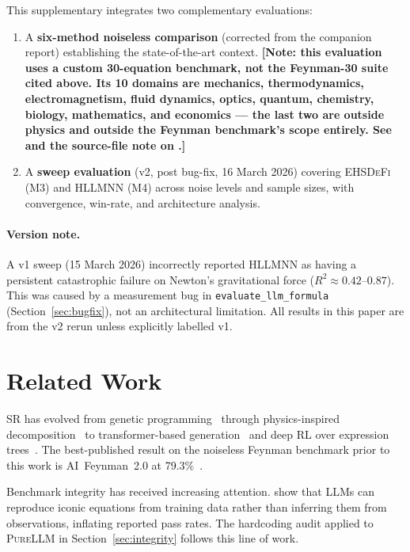 \documentclass[twoside,11pt]{article}
\newcommand{\PureLLM}{\textsc{PureLLM}}
\newcommand{\EHD}{\textsc{EHSDeFi}}
\newcommand{\HSL}{\textsc{HLLMNN}}
\newcommand{\Rsq}{R^{2}}
\begin{document}
This supplementary integrates two complementary evaluations:
\begin{enumerate}
  \item A \textbf{six-method noiseless comparison} (corrected from the
    companion report) establishing the state-of-the-art context. \textbf{[Note:
    this evaluation uses a custom 30-equation benchmark, not the Feynman-30
    suite cited above. Its 10 domains are mechanics, thermodynamics,
    electromagnetism, fluid dynamics, optics, quantum, chemistry, biology,
    mathematics, and economics --- the last two are outside physics and
    outside the Feynman benchmark's scope entirely. See
     and the source-file note on .]}
  \item A \textbf{sweep evaluation} (v2, post bug-fix, 16 March 2026)
    covering \EHD{} (M3) and \HSL{} (M4) across noise levels and sample
    sizes, with convergence, win-rate, and architecture analysis.
\end{enumerate}

\paragraph{Version note.}
A v1 sweep (15 March 2026) incorrectly reported \HSL{} as having a persistent
catastrophic failure on Newton's gravitational force ($\Rsq \approx 0.42$--$0.87$).
This was caused by a measurement bug in \texttt{evaluate\_llm\_formula}
(Section~\ref{sec:bugfix}), not an architectural limitation.  All results in
this paper are from the v2 rerun unless explicitly labelled v1.

\section{Related Work}
\label{suppb:related}

SR has evolved from genetic programming~\citep{schmidt2009distilling} through
physics-inspired decomposition~\citep{udrescu2020ai} to transformer-based
generation~\citep{biggio2021neural,shojaee2023transformer} and deep RL over
expression trees~\citep{petersen2021deep}.  The best-published result on the
noiseless Feynman benchmark prior to this work is AI~Feynman~2.0 at
79.3\%~\citep{udrescu2020aifeynman2}.

Benchmark integrity has received increasing attention.
\citet{memorization2024audit} show that LLMs can reproduce iconic equations
from training data rather than inferring them from observations, inflating
reported pass rates.  The hardcoding audit applied to \PureLLM{} in
Section~\ref{sec:integrity} follows this line of work.
\end{document}
